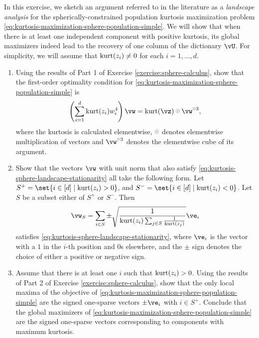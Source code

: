 \documentclass[../../book-main.tex]{subfiles}
\begin{document}
\begin{exercise}\label{exercise:kurtosis-sphere-landscape}
    In this exercise, we sketch an argument referred to in the literature as a \textit{landscape analysis} for the spherically-constrained population kurtosis maximization problem \eqref{eq:kurtosis-maximization-sphere-population-simple}. We will show that when there is at least one independent component with positive kurtosis, its 
    global maximizers indeed lead to the recovery of one column of the dictionary $\vU$.
    For simplicity, we will assume that $\mathop{\mathrm{kurt}}(z_i) \neq 0$ for each $i = 1, \dots, d$.
    \begin{enumerate}
        \item Using the results of Part 1 of Exercise \ref{exercise:sphere-calculus}, 
        show that the first-order optimality condition for \eqref{eq:kurtosis-maximization-sphere-population-simple} is
        \begin{equation}\label{eq:kurtosis-sphere-landscape-stationarity}
            \left(\sum_{i=1}^d \kurt(z_i) w_i^4 \right) 
            \vw = \kurt(\vz) \hada \vw^{\hada 3}, 
        \end{equation}
        where the kurtosis is calculated elementwise, $\hada$ denotes elementwise multiplication of vectors and $\vw^{\hada 3}$ denotes the elementwise cube of its argument.
        \item Show that the vectors $\vw$ with unit norm that also satisfy \eqref{eq:kurtosis-sphere-landscape-stationarity}
        all take the following form.
        Let $S^+ = \set{i \in [d] \given \kurt(z_i) > 0}$, and 
        $S^- = \set{i \in [d] \given \kurt(z_i) < 0}$.
        Let $S$ be a subset either of $S^+$ or $S^-$.
        Then 
        \begin{equation}\label{eq:kurtosis-sphere-landscape-cps}
            \vw_S = \sum_{i \in S} \pm \sqrt{\frac{1}{\kurt(z_i) \sum_{j \in S} \frac{1}{\kurt(z_j)}}} \ve_i
        \end{equation}
        satisfies \eqref{eq:kurtosis-sphere-landscape-stationarity},
        where $\ve_i$ is the vector with a $1$ in the $i$-th position and $0$s elsewhere, and the $\pm$ sign denotes the choice of either a positive or negative sign.
        \item Assume that there is at least one $i$ such that $\mathop{\mathrm{kurt}}(z_i) > 0$. Using the results of Part 2 of Exercise \ref{exercise:sphere-calculus}, show that the only local maxima of the objective of \eqref{eq:kurtosis-maximization-sphere-population-simple} are the signed one-sparse vectors $\pm \ve_i$ with $i \in S^+$. Conclude that the global maximizers of \eqref{eq:kurtosis-maximization-sphere-population-simple} are the signed one-sparse vectors corresponding to components with maximum kurtosis. %

\end{enumerate}
\end{exercise}
\end{document}
